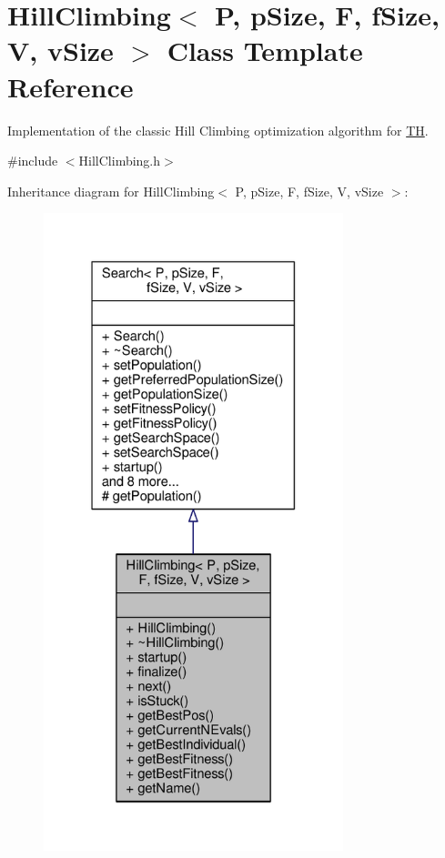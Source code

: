 \hypertarget{classHillClimbing}{}\section{Hill\+Climbing$<$ P, p\+Size, F, f\+Size, V, v\+Size $>$ Class Template Reference}
\label{classHillClimbing}


Implementation of the classic Hill Climbing optimization algorithm for \hyperlink{classTH}{TH}.  




{\ttfamily \#include $<$Hill\+Climbing.\+h$>$}



Inheritance diagram for Hill\+Climbing$<$ P, p\+Size, F, f\+Size, V, v\+Size $>$\+:
\nopagebreak
\begin{figure}[H]
\begin{center}
\leavevmode
\includegraphics[width=247pt]{classHillClimbing__inherit__graph}
\end{center}
\end{figure}


